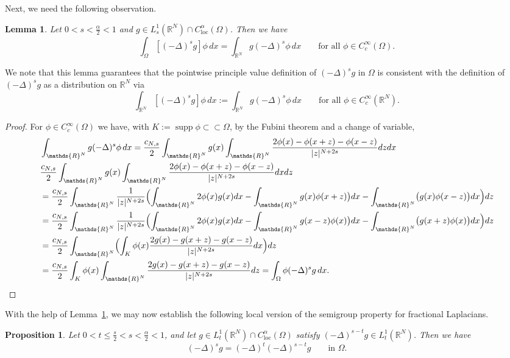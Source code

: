 \documentclass[notitlepage,11pt,reqno]{amsart}
\newtheorem{proposition}[theorem]{Proposition}
\newtheorem{lemma}[theorem]{Lemma}
\theoremstyle{definition}
\numberwithin{equation}{section}
\newcommand{\loc}{\mathrm{loc}}
\newcommand{\R}{\mathds{R}}
\DeclareMathOperator*{\supp}{supp}
\begin{document}
Next, we need the following observation.

\begin{lemma}
  \label{observation-pointwise}
  Let $0<s<\frac{\alpha}{2}<1$ and $g \in L^1_s(\R^N) \cap C^\alpha_{\loc}(\Omega)$.
Then we have 
\begin{equation}
  \label{eq:consistency-definitions}
\int_{\Omega}[(-\Delta)^sg] \phi\,dx =  \int_{\R^N}g (-\Delta)^s \phi\,dx \qquad \text{for all $\phi \in C^\infty_c(\Omega)$.}  
\end{equation}
\end{lemma}
We note that this lemma guarantees that the pointwise principle value definition of $(-\Delta)^sg$ in $\Omega$ is consistent with the definition of $(-\Delta)^s g$ as a distribution on $\R^N$ via
\begin{equation*}
  \label{eq:distr-definition}
    \int_{\R^N}[(-\Delta)^s g]  \phi\,dx :=   \int_{\R^N}g (-\Delta)^s \phi\,dx \qquad \text{for all $\phi \in C^\infty_c(\R^N)$.}
\end{equation*}

\begin{proof}
For $\phi \in C^\infty_c(\Omega)$ we have, with $K:=\supp \phi \subset \subset \Omega$, by the Fubini theorem and a change of variable, 
\begin{align*}
&\int_{\R^N}g (-\Delta)^s \phi\,dx = \frac{c_{N,s}}{2}\int_{\R^N}g(x)\int_{\R^N}\frac{2\phi(x)-\phi(x+z)-\phi(x-z)}{|z|^{N+2s}}dz dx\\
                                    &\frac{c_{N,s}}{2}\int_{\R^N}g(x)\int_{\R^N}\frac{2\phi(x)-\phi(x+z)-\phi(x-z)}{|z|^{N+2s}}dx dz\\
                                    & = \frac{c_{N,s}}{2}\int_{\R^N}\frac{1}{|z|^{N+2s}}\Bigl( \int_{\R^N} 2\phi(x)g(x)dx - \int_{\R^N}g(x)\phi(x+z)\bigr)dx -\int_{\R^N}\bigl(g(x) \phi(x-z)\bigr)dx\Bigr)dz\\ 
& = \frac{c_{N,s}}{2}\int_{\R^N}\frac{1}{|z|^{N+2s}}\Bigl( \int_{\R^N} 2\phi(x)g(x)dx - \int_{\R^N}g(x-z)\phi(x)\bigr)dx -\int_{\R^N}\bigl(g(x+z) \phi(x)\bigr)dx\Bigr)dz\\ 
& = \frac{c_{N,s}}{2}\int_{\R^N}\Bigl( \int_{K} \phi(x)\frac{2 g(x)-g(x+z)-g(x-z)}{|z|^{N+2s}}dx \Bigr)dz\\ 
& = \frac{c_{N,s}}{2}\int_{K} \phi(x) \int_{\R^N}\frac{2 g(x)-g(x+z)-g(x-z)}{|z|^{N+2s}}dz=\int_{\Omega} \phi (-\Delta)^sg\,dx.
\end{align*}
\end{proof}


With the help of Lemma~\ref{observation-pointwise}, we may now establish the following local version of the semigroup property for fractional Laplacians.
\begin{proposition}
\label{semigroup-general}
Let $0<t\le \frac{s}{2}<s<\frac{\alpha}{2}<1$, and let $g \in L^1_{t}(\R^N) \cap C^\alpha_{\loc}(\Omega)$ satisfy $(-\Delta)^{s-t} g \in L^1_{t}(\R^N)$. Then we have 
\begin{equation}
\label{semigroup-simple}
  (-\Delta)^s g = (-\Delta)^{t}(-\Delta)^{s-t} g \qquad \text{in $\Omega$.}
\end{equation}
\end{proposition}
\end{document}
